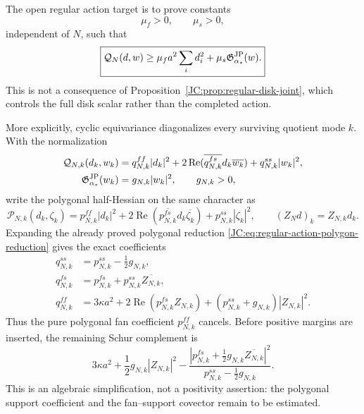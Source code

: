 \begin{contract}
The open regular action target is to prove constants
\begin{equation}\label{JC:eq:regular-action-constants}
 \mu_f>0,\qquad \mu_s>0,
\end{equation}
independent of $N$, such that
\begin{equation}\label{JC:eq:regular-action-Schur}
 \boxed{
 \mathcal Q_N(d,w)
 \ge \mu_fa^2\sum_i d_i^2+
      \mu_s\mathfrak G^{\rm JP}_{\alpha_*}(w).}
\end{equation}
This is not a consequence of Proposition~\ref{JC:prop:regular-disk-joint},
which controls the full disk scalar rather than the completed action.

More explicitly, cyclic equivariance diagonalizes every surviving quotient
mode $k$.  With the normalization
\begin{align*}
 \mathcal Q_{N,k}(d_k,w_k)
 &=q^{ff}_{N,k}|d_k|^2
   +2\operatorname {Re}(\overline{q^{fs}_{N,k}}d_k\overline{w_k})
   +q^{ss}_{N,k}|w_k|^2,\\
 \mathfrak G^{\rm JP}_{\alpha_*}(w_k)&=g_{N,k}|w_k|^2,
 \qquad g_{N,k}>0,
\end{align*}
write the polygonal half-Hessian on the same character as
\[
 \mathcal P_{N,k}(d_k,\zeta_k)
 =p^{ff}_{N,k}|d_k|^2
  +2\operatorname {Re}
    (\overline{p^{fs}_{N,k}}d_k\overline{\zeta_k})
  +p^{ss}_{N,k}|\zeta_k|^2,
 \qquad (Z_Nd)_k=Z_{N,k}d_k.
\]
Expanding the already proved polygonal reduction
\eqref{JC:eq:regular-action-polygon-reduction} gives the exact coefficients
\begin{equation}\label{JC:eq:regular-action-polygon-mode-coefficients}
 \boxed{
 \begin{aligned}
 q^{ss}_{N,k}&=p^{ss}_{N,k}-\frac12g_{N,k},\\
 q^{fs}_{N,k}&=p^{fs}_{N,k}+p^{ss}_{N,k}\overline{Z_{N,k}},\\
 q^{ff}_{N,k}&=3\kappa a^2
 {}+2\operatorname {Re}(p^{fs}_{N,k}Z_{N,k})
 +(p^{ss}_{N,k}+g_{N,k})|Z_{N,k}|^2.
 \end{aligned}}
\end{equation}
Thus the pure polygonal fan coefficient $p^{ff}_{N,k}$ cancels.  Before
positive margins are inserted, the remaining Schur complement is
\[
 3\kappa a^2+\frac12g_{N,k}|Z_{N,k}|^2
 -\frac{|p^{fs}_{N,k}+\frac12g_{N,k}\overline{Z_{N,k}}|^2}
 {p^{ss}_{N,k}-\frac12g_{N,k}}.
\]
This is an algebraic simplification, not a positivity assertion: the
polygonal support coefficient and the fan--support covector remain to be
estimated.


\end{contract}
